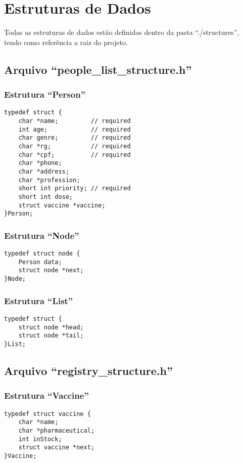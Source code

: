 \documentclass[12pt, a4paper]{article}
\begin{document}
\tableofcontents
\newpage

\section{Estruturas de Dados}\label{Estruturas de Dados}
Todas as estruturas de dados estão definidas dentro da pasta ``./structures'', tendo como referência a raiz do projeto.
\subsection{Arquivo ``people\_list\_structure.h''}\label{Arquivo``peoplelist.h''}
\subsubsection{Estrutura ``Person''}\label{Estrutura ``Person''}

\begin{lstlisting}
typedef struct {
    char *name;         // required
    int age;            // required
    char genre;         // required
    char *rg;           // required
    char *cpf;          // required
    char *phone;
    char *address;
    char *profession;
    short int priority; // required
    short int dose;
    struct vaccine *vaccine;
}Person;
\end{lstlisting}
\subsubsection{Estrutura ``Node''}\label{Estrutura ``Node''}
\begin{lstlisting}
typedef struct node {
    Person data;
    struct node *next;
}Node;
\end{lstlisting}
\subsubsection{Estrutura ``List''}\label{Estrutura ``List''}
\begin{lstlisting}
typedef struct {
    struct node *head;
    struct node *tail;
}List;
\end{lstlisting}
\subsection{Arquivo ``registry\_structure.h''}\label{Arquivo ``registry''}
\subsubsection{Estrutura ``Vaccine''}\label{Estrutura ``Vaccine''}
\begin{lstlisting}
typedef struct vaccine {
    char *name;
    char *pharmaceutical;
    int inStock;
    struct vaccine *next;
}Vaccine;
\end{lstlisting}
\end{document}
